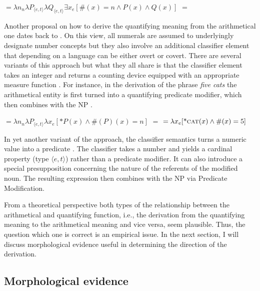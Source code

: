 \documentclass[output=paper]{langscibook}
\begin{document}
		\ea \ea {} $=\lambda n_n\lambda P_{\langle e,t\rangle}\lambda Q_{\langle e,t\rangle}\exists x_e[\#(x)=n \wedge P(x) \wedge Q(x)]$\label{ex:many}
        \ex {} $=$ \label{ex:five-many}
        \z
        \z

\noindent Another proposal on how to derive the quantifying meaning from the arithmetical one dates back to \citet{krifka1995common}. On this view, all numerals are assumed to underlyingly designate number concepts but they also involve an additional classifier element that depending on a language can be either overt or covert. There are several variants of this approach but what they all share is that the classifier element takes an integer and returns a counting device equipped with an appropriate measure function  \citep{scontras2014semantics,wagiel2018subatomic}. For instance, in the derivation of the phrase \textit{five cats} the arithmetical entity is first turned into a quantifying predicate modifier, which then combines with the NP .

		\ea \ea {} $= \lambda n_n\lambda P_{\langle e,t\rangle}\lambda x_e[\text{*}P(x) \wedge  \#(P)(x)=n]$\label{ex:cl}
        \ex {} $=$ \sib{[ [ 5 \cnst{cl} ] cats ]} $= \lambda x_e[\text{*}\textsc{cat}(x) \wedge \#(x)=5]$\label{ex:five-cl}
        \z
        \z

\noindent In yet another variant of the approach, the classifier semantics turns a numeric value into a predicate \citep{sudo2016semantic}. The classifier takes a number and yields a cardinal property (type $\langle e,t\rangle$) rather than a predicate modifier. It can also introduce a special presupposition concerning the nature of the referents of the modified noun. The resulting expression then combines with the NP via Predicate Modification. 

From a theoretical perspective both types of the relationship between the arithmetical and quantifying function, i.e., the derivation from the quantifying meaning to the arithmetical meaning and vice versa, seem plausible. Thus, the question which one is correct is an empirical issue. In the next section, I will discuss morphological evidence useful in determining the direction of the derivation.

	\subsection{Morphological evidence}\label{sec:morphological-evidence}
	
\end{document}
